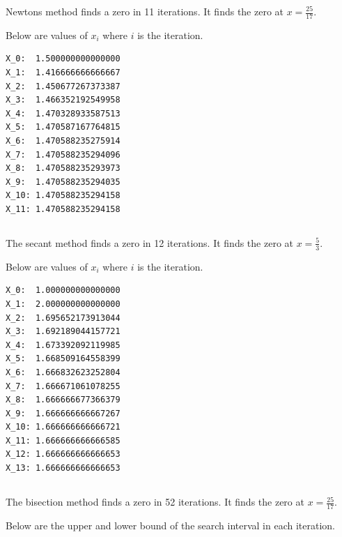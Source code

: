 \documentclass[12pt]{article}
\begin{document}
Newtons method finds a zero in 11 iterations. It finds the zero at $x = \frac{25}{17}$.

Below are values of $x_i$ where $i$ is the iteration. 

\begin{minipage}{\linewidth}
\begin{lstlisting}
X_0:  1.500000000000000
X_1:  1.416666666666667
X_2:  1.450677267373387
X_3:  1.466352192549958
X_4:  1.470328933587513
X_5:  1.470587167764815
X_6:  1.470588235275914
X_7:  1.470588235294096
X_8:  1.470588235293973
X_9:  1.470588235294035
X_10: 1.470588235294158
X_11: 1.470588235294158
\end{lstlisting}
\end{minipage}

\subsection{}

The secant method finds a zero in 12 iterations. It finds the zero at $x = \frac{5}{3}$.

Below are values of $x_i$ where $i$ is the iteration.


\begin{minipage}{\linewidth}
\begin{lstlisting}
X_0:  1.000000000000000 
X_1:  2.000000000000000 
X_2:  1.695652173913044 
X_3:  1.692189044157721 
X_4:  1.673392092119985 
X_5:  1.668509164558399 
X_6:  1.666832623252804 
X_7:  1.666671061078255 
X_8:  1.666666677366379 
X_9:  1.666666666667267 
X_10: 1.666666666666721 
X_11: 1.666666666666585 
X_12: 1.666666666666653 
X_13: 1.666666666666653 
\end{lstlisting}
\end{minipage}

\subsection{}

The bisection method finds a zero in 52 iterations. It finds the zero at $x = \frac{25}{17}$.

Below are the upper and lower bound of the search interval in each iteration.
\end{document}
